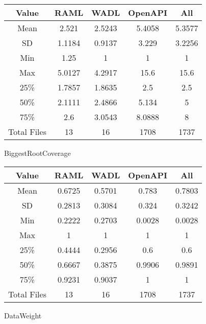 \begin{center}
  \begin{tabular}{ c|c|c|c|c}
    \hline
     \label{table:WSIC}
     Value & RAML & WADL & OpenAPI & All \\ \hline
     Mean &2.521 &2.5243 &5.4058 &5.3577 \\ \hline
     SD &1.1184&0.9137&3.229&3.2256 \\ \hline
     Min &1.25&1&1&1 \\ \hline
     Max &5.0127&4.2917&15.6&15.6 \\ \hline
     \rowcolor[HTML]{00FF00} 25\% &1.7857&1.8635&2.5&2.5 \\ \hline
     \rowcolor[HTML]{7FFF00} 50\% &2.1111&2.4866&5.134&5 \\ \hline
     \rowcolor[HTML]{FFFF00} 75\% &2.6&3.0543&8.0888&8 \\ \hline
     Total Files &13&16&1708&1737 \\ \hline
  \end{tabular}
 \end{center}

BiggestRootCoverage

\begin{center}
  \begin{tabular}{ c|c|c|c|c}
    \hline
     \label{table:WSIC}
     Value & RAML & WADL & OpenAPI & All \\ \hline
     Mean &0.6725 &0.5701 &0.783 &0.7803 \\ \hline
     SD &0.2813&0.3084&0.324&0.3242 \\ \hline
     Min &0.2222&0.2703&0.0028&0.0028 \\ \hline
     Max &1&1&1&1 \\ \hline
     \rowcolor[HTML]{00FF00} 25\% &0.4444&0.2956&0.6&0.6 \\ \hline
     \rowcolor[HTML]{7FFF00} 50\% &0.6667&0.3875&0.9906&0.9891 \\ \hline
     \rowcolor[HTML]{FFFF00} 75\% &0.9231&0.9037&1&1 \\ \hline
     Total Files &13&16&1708&1737 \\ \hline
  \end{tabular}
 \end{center}

DataWeight

